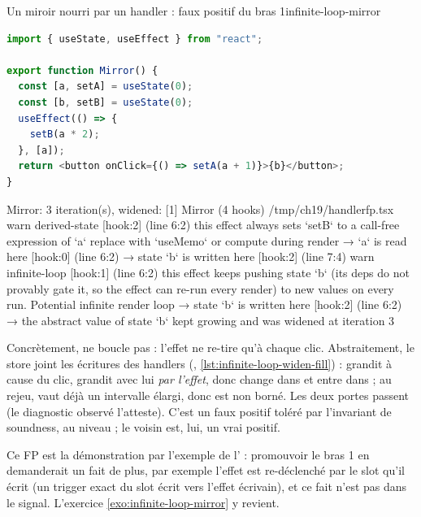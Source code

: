 \begin{exemple}{Un miroir nourri par un handler : faux positif du bras 1}{infinite-loop-mirror}
\begin{lstlisting}[language=TypeScript,caption={\file{/tmp/ch19/handlerfp.tsx}},label={lst:infinite-loop-mirror}]
import { useState, useEffect } from "react";

export function Mirror() {
  const [a, setA] = useState(0);
  const [b, setB] = useState(0);
  useEffect(() => {
    setB(a * 2);
  }, [a]);
  return <button onClick={() => setA(a + 1)}>{b}</button>;
}
\end{lstlisting}
\begin{sortie}
  [verbose] Mirror: 3 iteration(s), widened: [1]
  Mirror  (4 hooks)  /tmp/ch19/handlerfp.tsx
    warn   derived-state  [hook:2]  (line 6:2)  this effect always sets `setB` to a call-free expression of `a` replace with `useMemo` or compute during render
       → `a` is read here [hook:0] (line 6:2)
       → state `b` is written here [hook:2] (line 7:4)
    warn   infinite-loop  [hook:1]  (line 6:2)  this effect keeps pushing state `b` (its deps do not provably gate it, so the effect can re-run every render) to new values on every run. Potential infinite render loop
       → state `b` is written here [hook:2] (line 6:2)
       → the abstract value of state `b` kept growing and was widened at iteration 3
\end{sortie}
Concrètement,  ne boucle pas : l'effet ne re-tire qu'à chaque clic. Abstraitement, le store joint les écritures des handlers (, \cref{lst:infinite-loop-widen-fill}) :  grandit à cause du clic,  grandit avec lui \emph{par l'effet}, donc  change dans  et entre dans  ; au rejeu,  vaut déjà un intervalle élargi, donc  est non borné. Les deux portes passent (le diagnostic observé l'atteste). C'est un faux positif toléré par l'invariant de soundness, au niveau \Warning{} ; le  voisin est, lui, un vrai positif.
\end{exemple}

Ce FP est la démonstration par l'exemple de l' : promouvoir le bras 1 en \Error{} demanderait un fait de plus, par exemple \og l'effet est re-déclenché par le slot qu'il écrit\fg{} (un trigger exact du slot écrit vers l'effet écrivain), et ce fait n'est pas dans le signal. L'exercice \ref{exo:infinite-loop-mirror} y revient.


